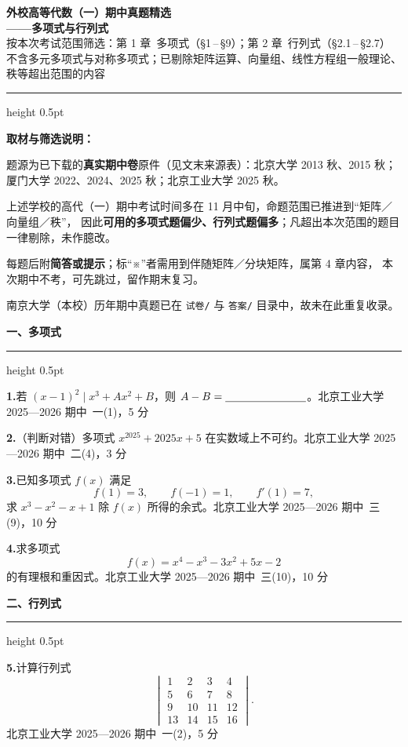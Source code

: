 ﻿\documentclass[11pt,a4paper,fontset=windows]{ctexart}
\newcommand{\src}[1]{\hfill{\small\color{hdgray}\songti #1}}
\newcommand{\prob}[2]{\Needspace{5\baselineskip}\par\vspace{10pt}\noindent
  \textbf{#1}\hspace{0.4em}#2\par\vspace{3pt}}
\newcommand{\grp}[1]{\Needspace{9\baselineskip}\par\vspace{14pt}%
  {\large\bfseries\songti #1}\par\vspace{2pt}\hrule height 0.5pt\par\vspace{6pt}}
\begin{document}
\begin{center}
{\LARGE\bfseries\songti 外校高等代数（一）期中真题精选}\\[4pt]
{\LARGE\bfseries\songti ——多项式与行列式}\\[7pt]
{\small\color{hdgray}\songti 按本次考试范围筛选：第 1 章\ 多项式（\S1\,--\,\S9）；第 2 章\ 行列式（\S2.1\,--\,\S2.7）}\\[2pt]
{\small\color{hdgray}\songti 不含多元多项式与对称多项式；已剔除矩阵运算、向量组、线性方程组一般理论、秩等超出范围的内容}
\end{center}
\vspace{-2pt}
\hrule height 0.5pt
\vspace{6pt}

{\small\songti
\textbf{取材与筛选说明：}
\begin{note}
\item 题源为已下载的\textbf{真实期中卷}原件（见文末来源表）：北京大学 2013 秋、2015 秋；厦门大学 2022、2024、2025 秋；北京工业大学 2025 秋。
\item 上述学校的高代（一）期中考试时间多在 11 月中旬，命题范围已推进到“矩阵／向量组／秩”，
      因此\textbf{可用的多项式题偏少、行列式题偏多}；凡超出本次范围的题目一律剔除，未作臆改。
\item 每题后附\textbf{简答或提示}；标“※”者需用到伴随矩阵／分块矩阵，属第 4 章内容，
      本次期中不考，可先跳过，留作期末复习。
\item 南京大学（本校）历年期中真题已在 \texttt{试卷/} 与 \texttt{答案/} 目录中，故未在此重复收录。
\end{note}}

\grp{一、多项式}

\prob{1.}{若 $(x-1)^{2}\mid x^{3}+Ax^{2}+B$，则 $A-B=\underline{\hspace{2.6cm}}$。\src{北京工业大学 2025—2026 期中\ 一(1)，5 分}}

\prob{2.}{（判断对错）多项式 $x^{2025}+2025x+5$ 在实数域上不可约。\src{北京工业大学 2025—2026 期中\ 二(4)，3 分}}

\prob{3.}{已知多项式 $f(x)$ 满足
\[
f(1)=3,\qquad f(-1)=1,\qquad f'(1)=7,
\]
求 $x^{3}-x^{2}-x+1$ 除 $f(x)$ 所得的余式。\src{北京工业大学 2025—2026 期中\ 三(9)，10 分}}

\prob{4.}{求多项式
\[
f(x)=x^{4}-x^{3}-3x^{2}+5x-2
\]
的有理根和重因式。\src{北京工业大学 2025—2026 期中\ 三(10)，10 分}}

\grp{二、行列式}

\prob{5.}{计算行列式
\[
\begin{vmatrix}
1&2&3&4\\
5&6&7&8\\
9&10&11&12\\
13&14&15&16
\end{vmatrix}.
\]
\src{北京工业大学 2025—2026 期中\ 一(2)，5 分}}
\end{document}
